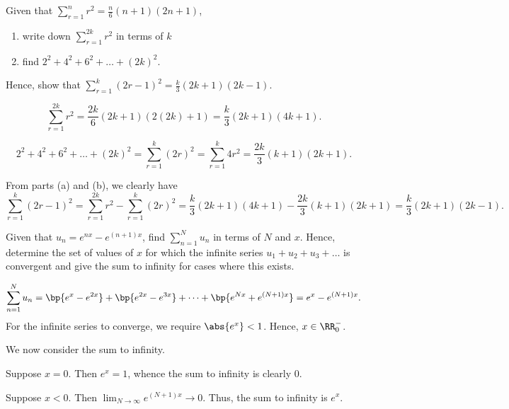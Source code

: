 \clearpage
\begin{problem}
    Given that $\sum_{r=1}^n r^2 = \frac{n}6 (n+1)(2n+1)$,

    \begin{enumerate}
        \item write down $\sum_{r=1}^{2k} r^2$ in terms of $k$
        \item find $2^2 + 4^2 + 6^2 + \ldots + (2k)^2$.
    \end{enumerate}

    Hence, show that $\sum_{r=1}^k (2r-1)^2 = \frac{k}3(2k+1)(2k-1)$.
\end{problem}
\begin{solution}
    \begin{ppart}
        \[\sum_{r=1}^{2k} r^2 = \frac{2k}6 (2k + 1)(2(2k) + 1) = \frac{k}3 (2k+1)(4k+1).\]
    \end{ppart}
    \begin{ppart}
        \[2^2 + 4^2 + 6^2 + \ldots + (2k)^2 = \sum_{r=1}^k (2r)^2 = \sum_{r=1}^k 4r^2 = \frac{2k}3 (k+1)(2k+1).\]
    \end{ppart}

    From parts (a) and (b), we clearly have
    \[\sum_{r=1}^k (2r-1)^2 = \sum_{r=1}^{2k} r^2 - \sum_{r=1}^k (2r)^2 = \frac{k}3 (2k+1)(4k+1) - \frac{2k}3 (k+1)(2k+1) = \frac{k}3 (2k+1) (2k-1).\]
\end{solution}

\begin{problem}
    Given that $u_n = e^{nx} - e^{(n+1)x}$, find $\sum_{n=1}^N u_n$ in terms of $N$ and $x$. Hence, determine the set of values of $x$ for which the infinite series $u_1 + u_2 + u_3 + \ldots$ is convergent and give the sum to infinity for cases where this exists.
\end{problem}
\begin{solution}
    \[\sum_{n=1}^N u_n = \bp{e^x - e^{2x}} + \bp{e^{2x} - e^{3x}} + \cdots + \bp{e^{Nx} + e^{(N+1)x}} = e^x - e^{(N+1)x}.\] For the infinite series to converge, we require $\abs{e^x} < 1$. Hence, $x \in \RR^-_0$.

    We now consider the sum to infinity.
    
     Suppose $x = 0$. Then $e^x = 1$, whence the sum to infinity is clearly 0.

     Suppose $x < 0$. Then $\lim_{N \to \infty} e^{(N+1)x} \to 0$. Thus, the sum to infinity is $e^x$.
\end{solution}

